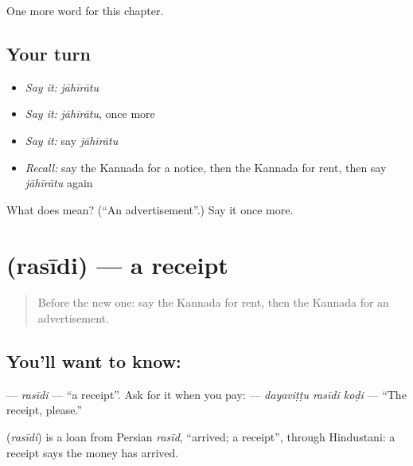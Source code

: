 \begin{grammarlens}[title={What you've built}]
One more word for this chapter.
\end{grammarlens}

\subsection*{Your turn}
\begin{itemize}
\raggedright
  \item \emph{Say it:} \emph{jāhīrātu}
  \item \emph{Say it:} \emph{jāhīrātu}, once more
  \item \emph{Say it:} say \emph{jāhīrātu}
  \item \emph{Recall:} say the Kannada for a notice, then the Kannada for rent, then say \emph{jāhīrātu} again
\end{itemize}

\begin{tcolorbox}[breakable,colback=teal!4,colframe=teal!35!black,title={Before you move on}]
What does  mean? (\textquotedblleft{}An advertisement\textquotedblright{}.) Say it once more.
\end{tcolorbox}
\section[\texorpdfstring{\kn{ರಸೀದಿ} (rasīdi)}{ರಸೀದಿ (rasīdi)}]{ (rasīdi) — a receipt}

\label{lesson:KA-C157-rasidi}



\begin{quote}
Before the new one: say the Kannada for rent, then the Kannada for an advertisement.
\end{quote}

\subsection*{You'll want to know: }
\textbf{} — \emph{rasīdi} — \textquotedblleft{}a receipt\textquotedblright{}. Ask for it when you pay: \textbf{  } — \emph{dayaviṭṭu rasīdi koḍi} — \textquotedblleft{}The receipt, please.\textquotedblright{}

\begin{cousinweb}
\textbf{} (\emph{rasīdi}) is a loan from Persian \emph{rasīd}, \textquotedblleft{}arrived; a receipt\textquotedblright{}, through Hindustani: a receipt says the money has arrived.
\end{cousinweb}


